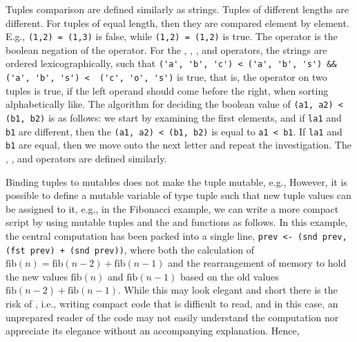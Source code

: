 Tuples comparison are defined similarly as strings. Tuples of different lengths are different. For tuples of equal length, then they are compared element by element. E.g., \lstinline!(1,2) = (1,3)! is false, while \lstinline!(1,2) = (1,2)! is true. The \lexeme{<>} operator is the boolean negation of the \lexeme{=} operator. For the \lexeme{<} , \lexeme{<=}, \lexeme{>}, and \lexeme{>=} operators, the strings are ordered lexicographically, such that \lstinline!('a', 'b', 'c') < ('a', 'b', 's') && ('a', 'b', 's') <  ('c', 'o', 's')! is true, that is, the \lexeme{<} operator on two tuples is true, if the left operand should come before the right, when sorting alphabetically like. 
%
%
The algorithm for deciding the boolean value of \lstinline!(a1, a2) < (b1, b2)! is as follows: we start by examining the first elements, and if \lstinline!la1! and \lstinline!b1! are different, then the \lstinline!(a1, a2) < (b1, b2)! is equal to \lstinline!a1 < b1!. If \lstinline!la1! and \lstinline!b1! are equal, then we move onto the next letter and repeat the investigation. The \lexeme{<=}, \lexeme{>}, and \lexeme{>=} operators are defined similarly.

Binding tuples to mutables does not make the tuple mutable, e.g.,
%
%
However, it is possible to define a mutable variable of type tuple such that new tuple values can be assigned to it, e.g., in the Fibonacci example, we can write a more compact script by using mutable tuples and the  and  functions as follows.
%
%
In this example, the central computation has been packed into a single line, \lstinline!prev <- (snd prev, (fst prev) + (snd prev))!, where both the calculation of $\text{fib}(n) = \text{fib}(n-2) + \text{fib}(n-1)$ and the rearrangement of memory to hold the new values $\text{fib}(n)$ and $\text{fib}(n-1)$ based on the old values $\text{fib}(n-2) + \text{fib}(n-1)$. While this may look elegant and short there is the risk of , i.e., writing compact code that is difficult to read, and in this case, an unprepared reader of the code may not easily understand the computation nor appreciate its elegance without an accompanying explanation.  Hence, 

